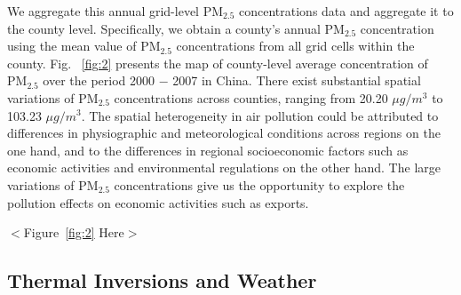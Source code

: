 \documentclass[12pt]{article}
\begin{document}
   We aggregate this annual grid-level $\mathrm{PM_{2.5}}$ concentrations data and aggregate it to the county level.
  Specifically, we obtain a county's annual $\mathrm{PM_{2.5}}$ concentration
  using the mean value of $\mathrm{PM_{2.5}}$ concentrations from all grid
  cells within the county. Fig.~%
  \ref{fig:2} presents the map of county-level average concentration of $%
  \mathrm{PM_{2.5}}$ over the period 2000 $-$ 2007 in China. There exist
  substantial spatial variations of $\mathrm{PM_{2.5}}$ concentrations across
  counties, ranging from 20.20 $\mu g/m^{3}$ to 103.23 $\mu g/m^{3}$. The spatial heterogeneity in air pollution could be
  attributed to differences in physiographic and meteorological conditions
  across regions on the one hand, and to the differences in regional
  socioeconomic factors such as economic activities and environmental
  regulations on the other hand. The large variations of $\mathrm{PM_{2.5}}$
  concentrations give us the opportunity to explore the pollution effects on
  economic activities such as exports. 
  
  \begin{center}
  $<$Figure~\ref{fig:2} Here$>$
  \end{center}

  \subsection{Thermal Inversions and Weather}
\end{document}
